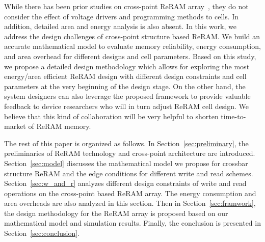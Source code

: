 While there has been prior studies on cross-point ReRAM array~\cite{crossbar_NANO2002_Ziegler,crossbar_NANO08_Flocke,crossbar_TED_2010,crossbar_NANO2003_Ziegler}, they do not consider the effect of voltage drivers and programming methods to cells.
In addition, detailed area and energy analysis is also absent.
In this work, we address the design challenges of cross-point structure based ReRAM. We build an accurate mathematical model to evaluate memory reliability, energy consumption, and area overhead for different designs and cell parameters. Based on this study, we propose a detailed design methodology which allows for exploring the most energy/area efficient ReRAM design with different design constraints and cell parameters at the very beginning of the design stage. On the other hand, the system designers can also leverage the proposed framework to provide valuable feedback to device researchers who will in turn adjust ReRAM cell design. We believe that this kind of collaboration will be very helpful to shorten time-to-market of ReRAM memory.

The rest of this paper is organized as follows. In
Section~\ref{sec:preliminary}, the preliminaries of ReRAM technology and cross-point architecture are introduced. Section~\ref{sec:model} discusses the mathematical model we propose for crossbar structure ReRAM and the edge conditions for different write and read schemes. Section~\ref{sec:w_and_r} analyzes different design constraints of write and read operations on the cross-point based ReRAM array. The energy consumption and area overheads are also analyzed in this section. Then in Section~\ref{sec:framwork}, the design methodology for the ReRAM array is proposed based on our mathematical model and simulation results. Finally, the conclusion is presented in Section~\ref{sec:conclusion}.
